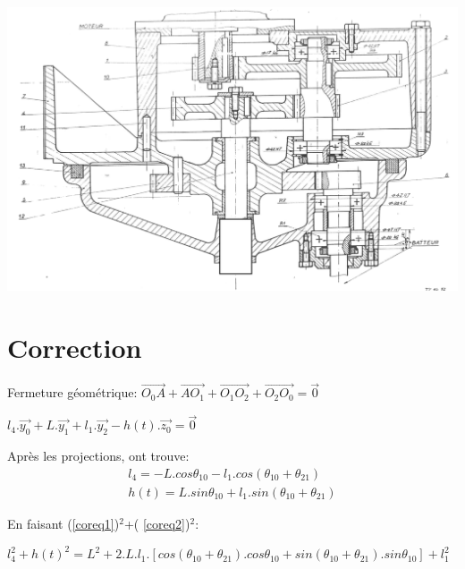 
\newpage



\begin{center}
	\includegraphics[width=0.9\linewidth]{img/Malaxeur_vierge}
\end{center}

\ifdef{\public}{}{}

\newpage
\cleardoublepage

\pagestyle{correction}

\setcounter{equation}{0}

\section{Correction}

\cor

Fermeture géométrique:
$\overrightarrow{O_0A}+\overrightarrow{AO_1}+\overrightarrow{O_1O_2}+\overrightarrow{O_2O_0}=\overrightarrow{0}$

$l_4.\overrightarrow{y_0}+L.\overrightarrow{y_1}+l_1.\overrightarrow{y_2}-h(t).\overrightarrow{z_0}=\overrightarrow{0}$

Après les projections, ont trouve:
\begin{eqnarray}
l_4=-L.cos\theta_{10}-l_1.cos(\theta_{10}+\theta_{21}) \label{coreq1}\\
h(t)=L.sin\theta_{10}+l_1.sin(\theta_{10}+\theta_{21}) \label{coreq2}
\end{eqnarray}

\cor

En faisant (\ref{coreq1})$^2$+( \ref{coreq2})$^2$:

$l_4^2+h(t)^2=L^2+2.L.l_1.\left[cos(\theta_{10}+\theta_{21}).cos\theta_{10}+sin(\theta_{10}+\theta_{21}).sin\theta_{10}\right]+l_1^2$

